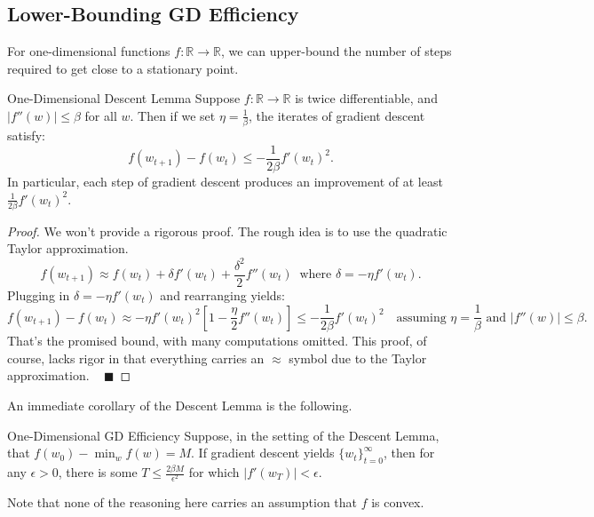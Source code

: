 \subsection{Lower-Bounding GD Efficiency}

For one-dimensional functions $f \colon \mathbb{R} \to \mathbb{R}$,
we can upper-bound the number of steps required
to get close to a stationary point.

\begin{theorem}{One-Dimensional Descent Lemma}
    Suppose $f \colon \mathbb{R} \to \mathbb{R}$ is twice differentiable,
    and $|f''(w)| \leq \beta$ for all $w$.
    Then if we set $\eta = \frac{1}{\beta}$,
    the iterates of gradient descent satisfy:
    \[ f(w_{t + 1}) - f(w_t) \leq -\frac{1}{2\beta} f'(w_t)^2. \]
    In particular, each step of gradient descent
    produces an improvement
    of at least $\frac{1}{2\beta} f'(w_t)^2$.
\end{theorem}

\begin{proof}
    We won't provide a rigorous proof.
    The rough idea is to use the quadratic Taylor approximation.
    \[
        f(w_{t + 1})
        \approx f(w_t) + \delta f'(w_t) + \frac{\delta^2}{2}f''(w_t)
        ~ \text{ where } \delta = -\eta f'(w_t).
    \]
    Plugging in $\delta = -\eta f'(w_t)$
    and rearranging yields:
    \[ f(w_{t + 1}) - f(w_t)
    \approx - \eta f'(w_t)^2 \left[ 1 - \frac{\eta}{2} f''(w_t) \right]
    \leq -\frac{1}{2\beta} f'(w_t)^2
    ~~~ \text{ assuming }
    \eta = \frac{1}{\beta}
    \text{ and }
    |f''(w)| \leq \beta. \]
    That's the promised bound, with many computations omitted.
    This proof, of course, lacks rigor in that
    everything carries an $\approx$ symbol
    due to the Taylor approximation. ~ $\blacksquare$
\end{proof}

An immediate corollary of the Descent Lemma is the following.

\begin{theorem}{One-Dimensional GD Efficiency}
    Suppose, in the setting of the Descent Lemma,
    that $f(w_0) - \min_w f(w) = M$.
    If gradient descent yields $\{w_t\}_{t = 0}^{\infty}$,
    then for any $\epsilon > 0$,
    there is some $T \leq \frac{2 \beta M}{\epsilon^2}$
    for which $|f'(w_T)| < \epsilon$.
\end{theorem}

\begin{remark}
    Note that none of the reasoning here
    carries an assumption that $f$ is convex.
\end{remark}

